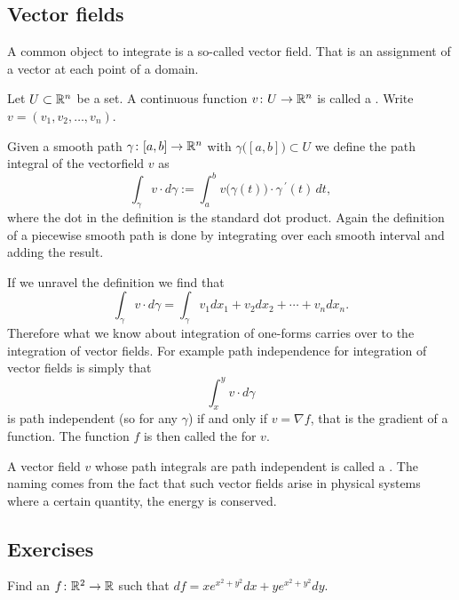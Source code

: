 \subsection{Vector fields}

A common object to integrate is a so-called vector field.  That is an
assignment of a vector at each point of a domain.

\begin{defn}
Let $U \subset {\mathbb{R}}^n$ be a set.
A continuous function $v \colon U \to {\mathbb{R}}^n$ is called a
\emph{}.  Write $v = (v_1,v_2,\ldots,v_n)$.

Given a smooth path $\gamma \colon [a,b] \to {\mathbb{R}}^n$ with
$\gamma\bigl([a,b]\bigr) \subset U$ we define
the path integral of the vectorfield $v$ as
\begin{equation*}
\int_{\gamma} v \cdot d\gamma
:=
\int_a^b v\bigl(\gamma(t)\bigr) \cdot \gamma^{\:\prime}(t) \, dt ,
\end{equation*}
where the dot in the definition is the standard dot product.
Again the definition of a piecewise smooth path is done by integrating over
each smooth interval and adding the result.
\end{defn}

If we unravel the definition we find that
\begin{equation*}
\int_{\gamma} v \cdot d\gamma
=
\int_{\gamma} v_1 dx_1 + v_2 dx_2 + \cdots + v_n dx_n .
\end{equation*}
Therefore what we know about integration of
one-forms carries over to the integration of vector fields.
For example path independence for integration of vector fields is simply
that
\begin{equation*}
\int_x^y v \cdot d\gamma
\end{equation*}
is path independent (so for any $\gamma$) if and only if 
$v = \nabla f$, that is the gradient of a function.  The function $f$
is then called the \emph{} for $v$.

A vector field $v$ whose path integrals are path independent is called
a \emph{}.  The naming comes from the
fact that such vector fields arise in physical systems
where a certain quantity, the energy is conserved.

\subsection{Exercises}

\begin{exercise}
Find an $f \colon {\mathbb{R}}^2 \to {\mathbb{R}}$ such that $df = xe^{x^2+y^2} dx +
ye^{x^2+y^2} dy$.
\end{exercise}

